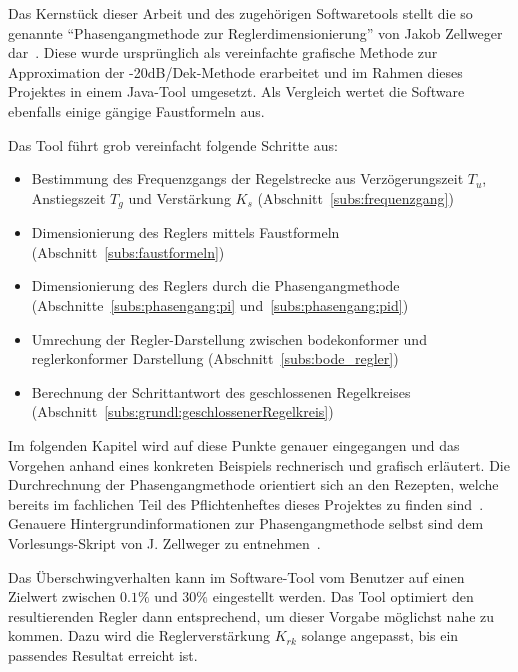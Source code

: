 Das  Kernst\"uck  dieser Arbeit  und  des  zugeh\"origen Softwaretools  stellt
die   so   genannte   ``Phasengangmethode  zur   Reglerdimensionierung''   von
Jakob   Zellweger   dar~\cite{regelungstechnik:zellweger_short}. Diese   wurde
urspr\"unglich  als  vereinfachte  grafische  Methode  zur  Approximation  der
-20dB/Dek-Methode erarbeitet und im Rahmen dieses Projektes in einem Java-Tool
umgesetzt. Als  Vergleich  wertet  die  Software  ebenfalls  einige  g\"angige
Faustformeln aus.

Das Tool f\"uhrt grob vereinfacht folgende Schritte aus:
\begin{itemize}
    \item
        Bestimmung des  Frequenzgangs der Regelstrecke  aus Verz\"ogerungszeit
        $T_u$,     Anstiegszeit     $T_g$      und     Verst\"arkung     $K_s$
        (Abschnitt~\ref{subs:frequenzgang})
    \item
        Dimensionierung       des      Reglers       mittels      Faustformeln
        (Abschnitt~\ref{subs:faustformeln})
    \item
        Dimensionierung    des    Reglers    durch    die    Phasengangmethode
        (Abschnitte~\ref{subs:phasengang:pi} und~\ref{subs:phasengang:pid})
    \item
        Umrechung   der   Regler-Darstellung    zwischen   bodekonformer   und
        reglerkonformer Darstellung (Abschnitt~\ref{subs:bode_regler})
    \item
        Berechnung   der   Schrittantwort   des   geschlossenen   Regelkreises
        (Abschnitt~\ref{subs:grundl:geschlossenerRegelkreis})
\end{itemize}

Im   folgenden   Kapitel   wird   auf   diese   Punkte   genauer   eingegangen
und   das    Vorgehen   anhand    eines   konkreten    Beispiels   rechnerisch
und    grafisch   erl\"autert. Die    Durchrechnung   der    Phasengangmethode
orientiert     sich     an     den     Rezepten,     welche     bereits     im
fachlichen     Teil     des     Pflichtenheftes    dieses     Projektes     zu
finden  sind~\cite{ref:pflichtenheft}. Genauere  Hintergrundinformationen  zur
Phasengangmethode  selbst  sind  dem  Vorlesungs-Skript  von  J. Zellweger  zu
entnehmen~\cite{regelungstechnik:zellweger_short}.

Das  \"Uberschwingverhalten  kann  im  Software-Tool vom  Benutzer  auf  einen
Zielwert zwischen  $0.1\%$ und  $30\%$ eingestellt werden. Das  Tool optimiert
den  resultierenden Regler  dann entsprechend,  um dieser  Vorgabe m\"oglichst
nahe zu kommen. Dazu wird  die Reglerverst\"arkung $K_{rk}$ solange angepasst,
bis ein passendes Resultat erreicht ist.

